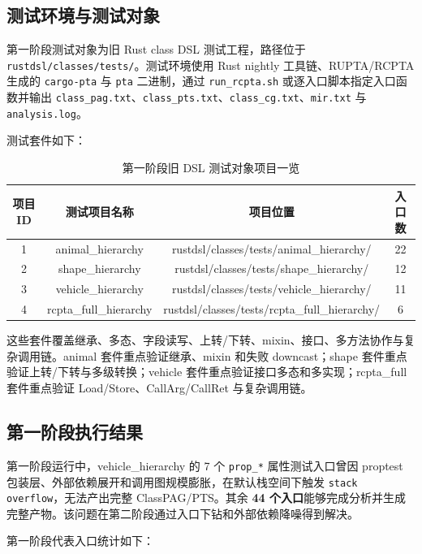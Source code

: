\documentclass[10.5pt,compsoc,UTF8]{cjc}
\theoremstyle{mystyle}
\begin{document}
\subsection{测试环境与测试对象}

第一阶段测试对象为旧 Rust class DSL 测试工程，路径位于 \texttt{rustdsl/classes/tests/}。测试环境使用 Rust nightly 工具链、RUPTA/RCPTA 生成的 \texttt{cargo-pta} 与 \texttt{pta} 二进制，通过 \texttt{run\_rcpta.sh} 或逐入口脚本指定入口函数并输出 \texttt{class\_pag.txt}、\texttt{class\_pts.txt}、\texttt{class\_cg.txt}、\texttt{mir.txt} 与 \texttt{analysis.log}。

测试套件如下：

\begin{table}[H]
\centering
\begin{tabular}{|c|c|c|c|}
\hline
\textbf{项目 ID} & \textbf{测试项目名称} & \textbf{项目位置} & \textbf{入口数} \\ \hline
1 & animal\_hierarchy & rustdsl/classes/tests/animal\_hierarchy/ & 22 \\ \hline
2 & shape\_hierarchy & rustdsl/classes/tests/shape\_hierarchy/ & 12 \\ \hline
3 & vehicle\_hierarchy & rustdsl/classes/tests/vehicle\_hierarchy/ & 11 \\ \hline
4 & rcpta\_full\_hierarchy & rustdsl/classes/tests/rcpta\_full\_hierarchy/ & 6 \\ \hline
\end{tabular}
\caption{第一阶段旧 DSL 测试对象项目一览}
\label{tab:phase1_test_suites}
\end{table}

这些套件覆盖继承、多态、字段读写、上转/下转、mixin、接口、多方法协作与复杂调用链。animal 套件重点验证继承、mixin 和失败 downcast；shape 套件重点验证上转/下转与多级转换；vehicle 套件重点验证接口多态和多实现；rcpta\_full 套件重点验证 Load/Store、CallArg/CallRet 与复杂调用链。

\subsection{第一阶段执行结果}

第一阶段运行中，vehicle\_hierarchy 的 7 个 \texttt{prop\_*} 属性测试入口曾因 proptest 包装层、外部依赖展开和调用图规模膨胀，在默认栈空间下触发 \texttt{stack overflow}，无法产出完整 ClassPAG/PTS。其余 \textbf{44 个入口}能够完成分析并生成完整产物。该问题在第二阶段通过入口下钻和外部依赖降噪得到解决。

第一阶段代表入口统计如下：
\end{document}

